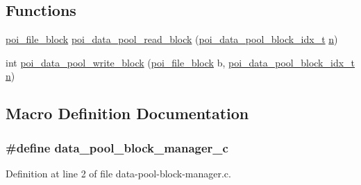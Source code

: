 \subsection*{Functions}
\begin{DoxyCompactItemize}
\item 
\hyperlink{structpoi__file__block}{poi\-\_\-file\-\_\-block} \hyperlink{data-pool-block-manager_8c_ac930ae4a4b3ca65a49d45c7654f15149}{poi\-\_\-data\-\_\-pool\-\_\-read\-\_\-block} (\hyperlink{data-pool-block-manager_8h_a87e19ab8290bcd76be1c7db1e90cc6f6}{poi\-\_\-data\-\_\-pool\-\_\-block\-\_\-idx\-\_\-t} \hyperlink{allocation-table-test_8c_a24010dade8ebab3f87a48022772cd975}{n})
\item 
int \hyperlink{data-pool-block-manager_8c_a10624f1cbc61dd0a8a03aa94d8502567}{poi\-\_\-data\-\_\-pool\-\_\-write\-\_\-block} (\hyperlink{structpoi__file__block}{poi\-\_\-file\-\_\-block} b, \hyperlink{data-pool-block-manager_8h_a87e19ab8290bcd76be1c7db1e90cc6f6}{poi\-\_\-data\-\_\-pool\-\_\-block\-\_\-idx\-\_\-t} \hyperlink{allocation-table-test_8c_a24010dade8ebab3f87a48022772cd975}{n})
\end{DoxyCompactItemize}


\subsection{Macro Definition Documentation}
\hypertarget{data-pool-block-manager_8c_acc334690346a1892e11c892ed27f70e7}{
\subsubsection[{data\-\_\-pool\-\_\-block\-\_\-manager\-\_\-c}]{\setlength{\rightskip}{0pt plus 5cm}\#define data\-\_\-pool\-\_\-block\-\_\-manager\-\_\-c}}\label{data-pool-block-manager_8c_acc334690346a1892e11c892ed27f70e7}


Definition at line 2 of file data-\/pool-\/block-\/manager.\-c.



